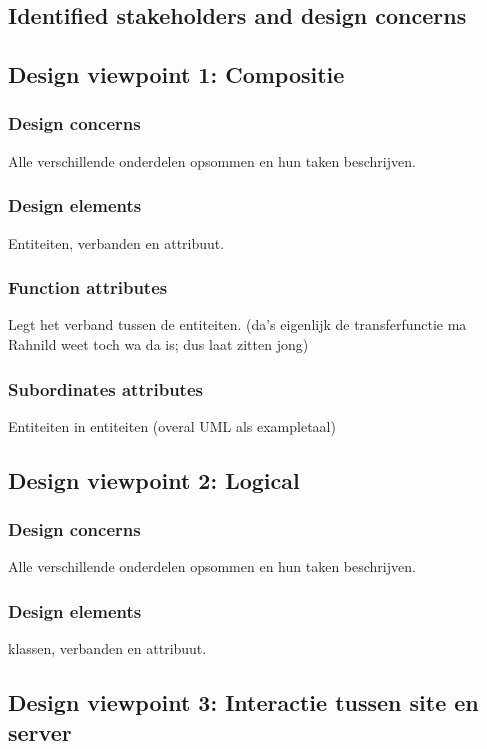 \documentclass{article}
\begin{document}
\subsection{Identified stakeholders and design concerns}

\subsection{Design viewpoint 1: Compositie}
\subsubsection{Design concerns}
Alle verschillende onderdelen opsommen en hun taken beschrijven.

\subsubsection{Design elements}
Entiteiten, verbanden en attribuut.

\subsubsection{Function attributes}
Legt het verband tussen de entiteiten. (da's eigenlijk de transferfunctie ma Rahnild weet toch wa da is; dus laat zitten jong)

\subsubsection{Subordinates attributes}
Entiteiten in entiteiten (overal UML als exampletaal)

\subsection{Design viewpoint 2: Logical}
\subsubsection{Design concerns}
Alle verschillende onderdelen opsommen en hun taken beschrijven.
\subsubsection{Design elements}
klassen, verbanden en attribuut.


\subsection{Design viewpoint 3: Interactie tussen site en server}
\end{document}
